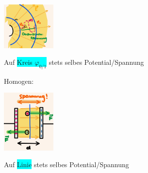 \vspace{-1mm}
    \begin{minipage}{0.41\linewidth}
        \begin{footnotesize}
            \begin{center}
                \vspace{2mm}
                \includegraphics[width = 27mm]{src/images/inhom_potentialfeld.png}
            \end{center}
        \end{footnotesize}
    \end{minipage}
    \begin{minipage}{0.58\linewidth}
        \begin{scriptsize}
            \begin{center}
                Auf \colorbox{Cyan}{Kreis $\varphi_{0/1}$} stets selbes Potential/Spannung
            \end{center}
        \end{scriptsize}
    \end{minipage}
    \vspace{2mm}
    
Homogen:

\vspace{-1mm}
    \begin{minipage}{0.41\linewidth}
        \begin{footnotesize}
            \begin{center}
                \vspace{2mm}
                \includegraphics[width = 27mm]{src/images/hom_potentialfeld.png}
            \end{center}
        \end{footnotesize}
    \end{minipage}
    \begin{minipage}{0.58\linewidth}
        \begin{scriptsize}
            \begin{center}
                Auf \colorbox{Cyan}{Linie} stets selbes Potential/Spannung
            \end{center}
        \end{scriptsize}
    \end{minipage}
    \vspace{1mm}